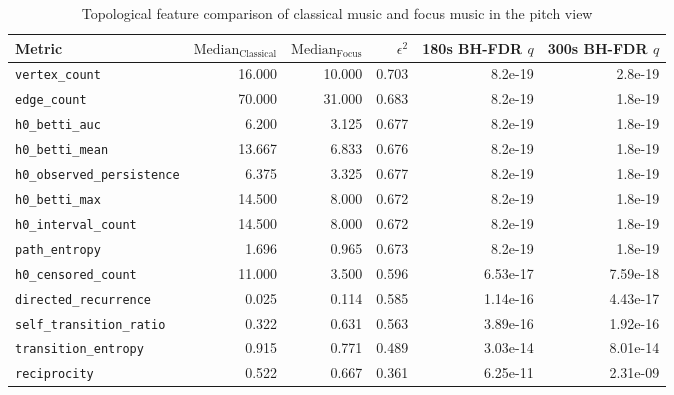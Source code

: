 \documentclass{article}
\begin{document}
\begin{table}[htbp]
\centering
\caption{Topological feature comparison of classical music and focus music in the pitch view}
\label{tab:pitch_topology}
\renewcommand{\arraystretch}{1.5}
\begin{tabular}{lrrrrr}
\toprule
Metric                    & $\text{Median}_{\text{Classical}}$ & $\text{Median}_{\text{Focus}}$ & $\epsilon^2$ & 180s BH-FDR $q$ & 300s BH-FDR $q$ \\
\midrule
\rowcolor{green!15}\verb|vertex_count|            &           16.000 &            10.000 &        0.703 &   8.2e-19 &   2.8e-19 \\
\rowcolor{green!15}\verb|edge_count|              &           70.000 &            31.000 &        0.683 &   8.2e-19 &   1.8e-19 \\
\rowcolor{green!15}\verb|h0_betti_auc|            &            6.200 &             3.125 &        0.677 &   8.2e-19 &   1.8e-19 \\
\rowcolor{green!15}\verb|h0_betti_mean|           &           13.667 &             6.833 &        0.676 &   8.2e-19 &   1.8e-19 \\
\rowcolor{green!15}\verb|h0_observed_persistence| &            6.375 &             3.325 &        0.677 &   8.2e-19 &   1.8e-19 \\
\rowcolor{green!15}\verb|h0_betti_max|            &           14.500 &             8.000 &        0.672 &   8.2e-19 &   1.8e-19 \\
\rowcolor{green!15}\verb|h0_interval_count|       &           14.500 &             8.000 &        0.672 &   8.2e-19 &   1.8e-19 \\
\rowcolor{green!15}\verb|path_entropy|            &            1.696 &             0.965 &        0.673 &   8.2e-19 &   1.8e-19 \\
\rowcolor{green!15}\verb|h0_censored_count|       &           11.000 &             3.500 &        0.596 &  6.53e-17 &  7.59e-18 \\
\rowcolor{green!15}\verb|directed_recurrence|     &            0.025 &             0.114 &        0.585 &  1.14e-16 &  4.43e-17 \\
\rowcolor{green!15}\verb|self_transition_ratio|   &            0.322 &             0.631 &        0.563 &  3.89e-16 &  1.92e-16 \\
\rowcolor{green!15}\verb|transition_entropy|      &            0.915 &             0.771 &        0.489 &  3.03e-14 &  8.01e-14 \\
\rowcolor{green!15}\verb|reciprocity|             &            0.522 &             0.667 &        0.361 &  6.25e-11 &  2.31e-09 \\

\end{tabular}
\end{table}
\end{document}
